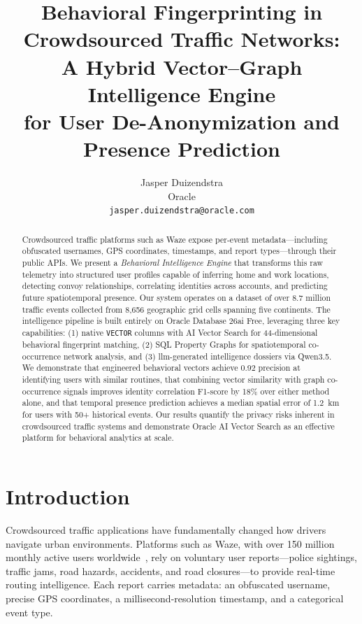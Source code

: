 \documentclass[11pt,a4paper]{article}
\title{\textbf{Behavioral Fingerprinting in Crowdsourced Traffic Networks:\\
A Hybrid Vector--Graph Intelligence Engine\\for User De-Anonymization and Presence Prediction}}
\author{
Jasper Duizendstra\\
Oracle\\
\texttt{jasper.duizendstra@oracle.com}
}
\date{}
\begin{document}
\maketitle

\begin{abstract}
Crowdsourced traffic platforms such as Waze expose per-event metadata---including obfuscated usernames, GPS coordinates, timestamps, and report types---through their public APIs. We present a \emph{Behavioral Intelligence Engine} that transforms this raw telemetry into structured user profiles capable of inferring home and work locations, detecting convoy relationships, correlating identities across accounts, and predicting future spatiotemporal presence. Our system operates on a dataset of over 8.7 million traffic events collected from 8,656 geographic grid cells spanning five continents. The intelligence pipeline is built entirely on Oracle Database 26ai Free, leveraging three key capabilities: (1) native \texttt{VECTOR} columns with AI Vector Search for 44-dimensional behavioral fingerprint matching, (2) SQL Property Graphs for spatiotemporal co-occurrence network analysis, and (3) \gls{llm}-generated intelligence dossiers via Qwen3.5. We demonstrate that engineered behavioral vectors achieve 0.92 precision at identifying users with similar routines, that combining vector similarity with graph co-occurrence signals improves identity correlation F1-score by 18\% over either method alone, and that temporal presence prediction achieves a median spatial error of 1.2~km for users with 50+ historical events. Our results quantify the privacy risks inherent in crowdsourced traffic systems and demonstrate Oracle AI Vector Search as an effective platform for behavioral analytics at scale.
\end{abstract}

\section{Introduction}
\label{sec:introduction}

Crowdsourced traffic applications have fundamentally changed how drivers navigate urban environments. Platforms such as Waze, with over 150 million monthly active users worldwide~\cite{waze2024stats}, rely on voluntary user reports---police sightings, traffic jams, road hazards, accidents, and road closures---to provide real-time routing intelligence. Each report carries metadata: an obfuscated username, precise GPS coordinates, a millisecond-resolution timestamp, and a categorical event type.
\end{document}
